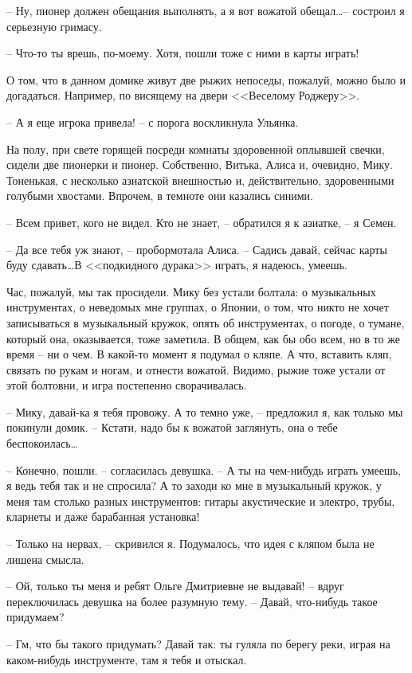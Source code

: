 \documentclass[a4paper]{book}
\begin{document}
-- Ну, пионер должен обещания выполнять, а я вот вожатой обещал\ldots -- состроил я серьезную гримасу.

-- Что-то ты врешь, по-моему. Хотя, пошли тоже с ними в карты играть!

О том, что в данном домике живут две рыжих непоседы, пожалуй, можно было и догадаться. Например, по висящему на двери <<Веселому Роджеру>>.

-- А я еще игрока привела! -- с порога воскликнула Ульянка.

На полу, при свете горящей посреди комнаты здоровенной оплывшей свечки, сидели две пионерки и пионер. Собственно, Витька, Алиса и, очевидно, Мику. Тоненькая, с несколько азиатской внешностью и, действительно, здоровенными голубыми хвостами. Впрочем, в темноте они казались синими.

-- Всем привет, кого не видел. Кто не знает, -- обратился я к азиатке, -- я Семен.

-- Да все тебя уж знают, -- пробормотала Алиса. -- Садись давай, сейчас карты буду сдавать\ldots В <<подкидного дурака>> играть, я надеюсь, умеешь.

Час, пожалуй, мы так просидели. Мику без устали болтала: о музыкальных инструментах, о неведомых мне группах, о Японии, о том, что никто не хочет записываться в музыкальный кружок, опять об инструментах, о погоде, о тумане, который она, оказывается, тоже заметила. В общем, как бы обо всем, но в то же время -- ни о чем. В какой-то момент я подумал о кляпе. А что, вставить кляп, связать по рукам и ногам, и отнести вожатой. Видимо, рыжие тоже устали от этой болтовни, и игра постепенно сворачивалась. 

-- Мику, давай-ка я тебя провожу. А то темно уже, -- предложил я, как только мы покинули домик. -- Кстати, надо бы к вожатой заглянуть, она о тебе беспокоилась\ldots 

-- Конечно, пошли. -- согласилась девушка. -- А ты на чем-нибудь играть умеешь, я ведь тебя так и не спросила? А то заходи ко мне в музыкальный кружок, у меня там столько разных инструментов: гитары акустические и электро, трубы, кларнеты и даже барабанная установка!

-- Только на нервах, -- скривился я. Подумалось, что идея с кляпом была не лишена смысла. 

-- Ой, только ты меня и ребят Ольге Дмитриевне не выдавай! -- вдруг переключилась девушка на более разумную тему. -- Давай, что-нибудь такое придумаем?

-- Гм, что бы такого придумать? Давай так: ты гуляла по берегу реки, играя на каком-нибудь инструменте, там я тебя и отыскал.
\end{document}
